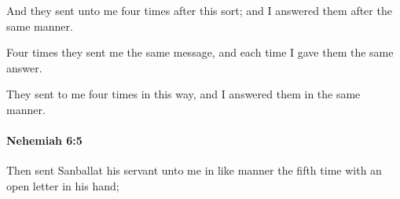 			\begin{versebox}
					\item[BHS] 
					\item[LXX] 
					\item[ASV] And they sent unto me four times after this sort; and I answered them after the same manner.
					\item[NIV] Four times they sent me the same message, and each time I gave them the same answer.
					\item[NRSV] They sent to me four times in this way, and I answered them in the same manner.
			\end{versebox}

		\paragraph{Nehemiah 6:5} %
			\label{NEHEMIAH-6-5}

			Then sent Sanballat his servant unto me in like manner the fifth time with an open letter in his hand;

